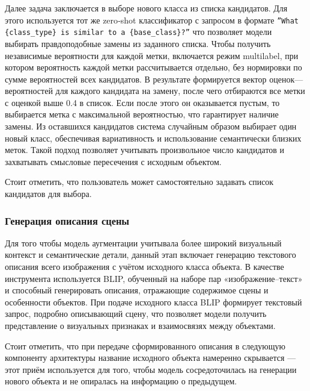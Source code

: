 Далее задача заключается в выборе нового класса из списка кандидатов. Для этого используется тот же zero‐shot классификатор с запросом в формате
\texttt{''What \{class\_type\} is similar to a \{base\_class\}?''}
что позволяет модели выбирать правдоподобные замены из заданного списка. Чтобы получить независимые вероятности для каждой метки, включается режим multilabel, при котором вероятность каждой метки рассчитывается отдельно, без нормировки по сумме вероятностей всех кандидатов. В результате формируется вектор оценок—вероятностей для каждого кандидата на замену, после чего отбираются все метки с оценкой выше 0.4 в список. Если после этого он оказывается пустым, то выбирается метка с максимальной вероятностью, что гарантирует наличие замены. Из оставшихся кандидатов система случайным образом выбирает один новый класс, обеспечивая вариативность и использование семантически близких меток. Такой подход позволяет учитывать произвольное число кандидатов и захватывать смысловые пересечения с исходным объектом.

Стоит отметить, что пользователь может самостоятельно задавать список кандидатов для выбора.

\subsubsection{Генерация описания сцены}
Для того чтобы модель аугментации учитывала более широкий визуальный контекст и семантические детали, данный этап включает генерацию текстового описания всего изображения с учётом исходного класса объекта. В качестве инструмента используется BLIP\cite{DBLP:journals/corr/abs-2201-12086}, обученный на наборе пар «изображение–текст» и способный генерировать описания, отражающие содержимое сцены и особенности объектов. При подаче исходного класса BLIP формирует текстовый запрос, подробно описывающий сцену, что позволяет модели получить представление о визуальных признаках и взаимосвязях между объектами.

Стоит отметить, что при передаче сформированного описания в следующую компоненту архитектуры название исходного объекта намеренно скрывается — этот приём используется для того, чтобы модель сосредоточилась на генерации нового объекта и не опиралась на информацию о предыдущем.

